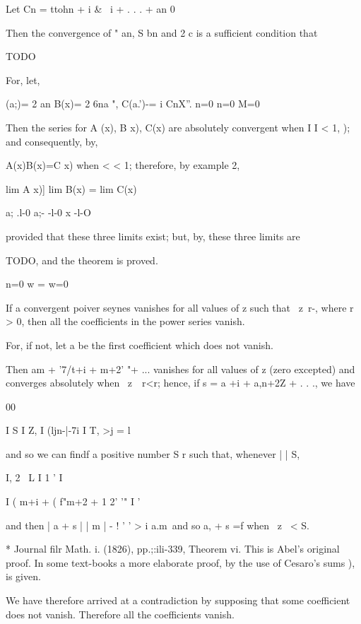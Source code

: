 Let Cn = ttohn + i \& \ i + . . . + an 0

Then the convergence of " an, S bn and 2 c is a sufficient condition
that

TODO

For, let,

 (a;)= 2 an B(x)= 2 6na ", C(a.')-= i CnX''. n=0 n=0 M=0

Then the series for A (x), B x), C(x) are absolutely convergent when I
I < 1, ); and consequently, by,

A(x)B(x)=C x) when < < 1; therefore, by example 2,

  lim A x)] lim B(x) = lim C(x)\

a; .l-0 a;- -l-0 x -l-O

provided that these three limits exist; but, by, these three
limits are

TODO, and the theorem is proved.

n=0 w = w=0


If a convergent poiver seynes vanishes for all values of z such that \
z\ r-, where r > 0, then all the coefficients in the power series
vanish.

For, if not, let a be the first coefficient which does not vanish.

Then am + '7/t+i + m+2' "+ ... vanishes for all values of z (zero
excepted) and converges absolutely when \ z\ \ r<r; hence, if s = a
+i + a,n+2Z + . . ., we have

00

I S I Z, I (ljn-|-7i I T, >j = l

and so we can findf a positive number S r such that, whenever | | S,

I, 2 \ L I 1 ' I

I ( m+i + ( f"m+2 +    1 2' '" I '

and then | a + s | | m | - ! ' ' > i a.m\, and so a, + s =f when \ z
\ < S.

* Journal filr Math. i. (1826), pp.;:ili-339, Theorem vi. This is
Abel's original proof. In some text-books a more elaborate proof, by
the use of Cesaro's sums \hardsubsectionref{8}{4}{3}), is given.

%
%

We have therefore arrived at a contradiction by supposing that some
coefficient does not vanish. Therefore all the coefficients vanish.

